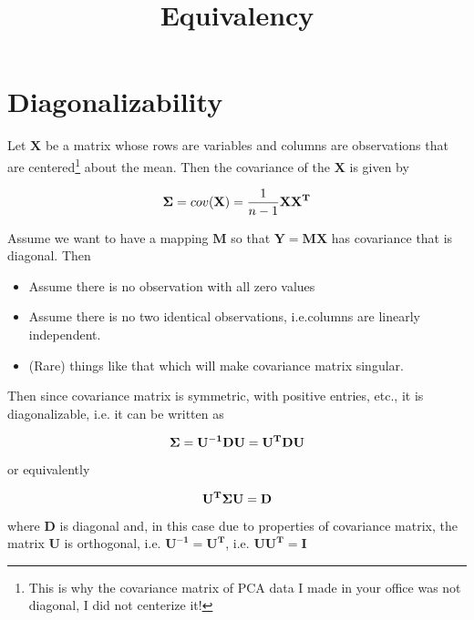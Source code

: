 \documentclass[12pt]{article}
\title{\textbf{Equivalency}}
\author{}
\date{}
\theoremstyle{plain}
\theoremstyle{definition}
\theoremstyle{definition}
\begin{document}
 

\maketitle

\section{Diagonalizability}

Let $\mathbf{X}$ be a matrix whose rows are variables and columns are observations that are centered\footnote{This is why the covariance matrix of PCA 
data I made in your office was not diagonal, I did not centerize it!} about the mean. 
Then the covariance of the $\mathbf{X}$ is given by

\begin{equation}
\mathbf{{\Large{\Sigma} }}= cov(\mathbf{X}) = \frac{1}{n-1}\mathbf{ XX^T}
\end{equation}

Assume we want to have a mapping $\mathbf{M}$ so that $\mathbf{Y=MX}$ has covariance 
that is diagonal. Then

\begin{itemize}
\item Assume there is no observation with all zero values
\item Assume there is no two identical observations, i.e.columns are linearly independent.
\item (Rare) things like that which will make covariance matrix singular.
\end{itemize}

Then since covariance matrix is symmetric, with positive entries, etc., it is diagonalizable, 
i.e. it can be written as 

\begin{equation}\label{eq:eigendecomposition}
\mathbf{{\Large{\Sigma} }}  = \mathbf{U^{-1} D U = U^T D U}
\end{equation}

or equivalently 

\begin{equation}\label{eq:eigendecomposition2}
\mathbf{U^T {\Large{\Sigma} }U }  = \mathbf{D}
\end{equation}

where $\mathbf{D}$ is diagonal and, in this case due to properties of covariance matrix, the 
matrix $\mathbf{U}$ is orthogonal, i.e. $\mathbf{U^{-1} = U^T}$, i.e. $\mathbf{UU^T} = \mathbf{I}$
\end{document}
